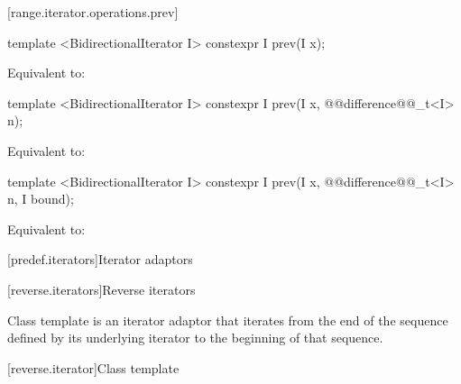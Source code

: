 [range.iterator.operations.prev]{}
%

\begin{itemdecl}
template <BidirectionalIterator I>
  constexpr I prev(I x);
\end{itemdecl}

\begin{itemdescr}
\pnum
\effects Equivalent to: 
\end{itemdescr}

\begin{itemdecl}
template <BidirectionalIterator I>
  constexpr I prev(I x, @@difference@@_t<I> n);
\end{itemdecl}

\begin{itemdescr}
\pnum
\effects Equivalent to: 
\end{itemdescr}

\begin{itemdecl}
template <BidirectionalIterator I>
  constexpr I prev(I x, @@difference@@_t<I> n, I bound);
\end{itemdecl}

\begin{itemdescr}
\pnum
\effects Equivalent to: 
\end{itemdescr}










[predef.iterators]{Iterator adaptors}

[reverse.iterators]{Reverse iterators}

\pnum
Class template  is an iterator adaptor that iterates
from the end of the sequence defined by its underlying iterator to the beginning
of that sequence. 

[reverse.iterator]{Class template }


